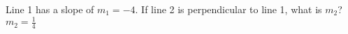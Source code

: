 {Line 1 has a slope of $m_1=-4$. If line 2 is perpendicular to line 1, what is $m_2$?}
{$m_2=\frac{1}{4}$}
